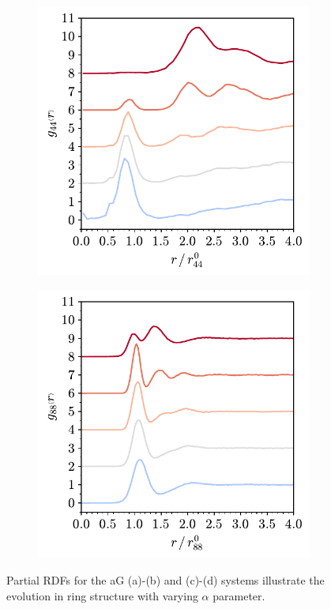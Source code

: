 \begin{figure}[bt]
     \begin{subfigure}[b]{0.45\textwidth}
         \centering
         \includegraphics[width=\textwidth]{./figures/targeted_opt/partial_gr_44_zach.pdf}
         \caption{}
         \label{fig:toptrdf3}
     \end{subfigure}
     \hfill
     \begin{subfigure}[b]{0.45\textwidth}
         \centering
         \includegraphics[width=\textwidth]{./figures/targeted_opt/partial_gr_88_zach.pdf}
         \caption{}
         \label{fig:toptrdf4}
     \end{subfigure}
     
     \caption{Partial RDFs for the aG (a)\--(b) and \zach{} (c)\--(d) systems illustrate the evolution in ring structure with varying $\alpha$ parameter.}
     \label{fig:toptrdf}
\end{figure}

